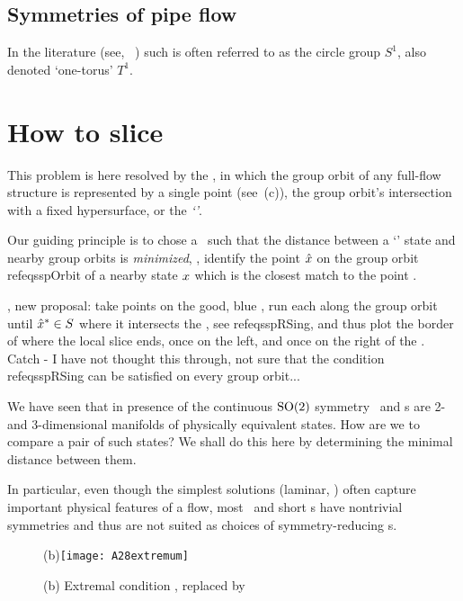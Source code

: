 \subsection{Symmetries of pipe flow}
\label{s:SymmPipe}

In the literature
(see, \eg\ ) such  is often referred to as the
circle group $S^1$, also denoted `one-torus' $T^1$.

\section{How to slice}
\label{s:algorithm}

This problem is here resolved by the
{\mslices}, in which
the group orbit of any full-flow structure is represented by a single
point (see \,(c)), the group orbit's intersection with a
fixed hypersurface, or the \emph{`\slice'}.

Our guiding principle is to chose a \slice\ such that the distance
between a `{\template}' state {\slicep} and nearby group orbits is
\emph{minimized}, \ie, identify the point $\hat{x}$ on the group orbit
 refeq{sspOrbit} of a nearby state $x$ which is the closest match to
the {\template} point {\slicep}.

, new proposal: take points on the good,
    blue \po, run each along the group orbit until $\hat{x}^\ast \in S$
    where it intersects the \sliceBord, see  refeq{sspRSing}, and thus plot
    the border of where the local slice ends, once on the left, and once
    on the right of the {\template}. Catch - I have not thought this
    through, not sure that the condition  refeq{sspRSing} can be
    satisfied on every group orbit...

We have seen that in presence of the continuous $\textrm{SO}(2)$ symmetry
\reqva\ and \rpo s are 2- and 3-dimensional manifolds of physically
equivalent states. How are we to compare a pair of such states? We shall
do this here by determining the minimal distance between them.

In particular, even though the
simplest solutions (laminar, \etc) often capture important physical
features of a flow, most \eqva\ and short \po s have nontrivial
symmetries and thus are not suited as choices of symmetry-reducing
{\template s}.

\begin{figure}
   \centering
(b)\texttt{[image: A28extremum]}
   \caption{\label{fig:A28extremum1}
    (b) Extremal condition , replaced by
}
\end{figure}

